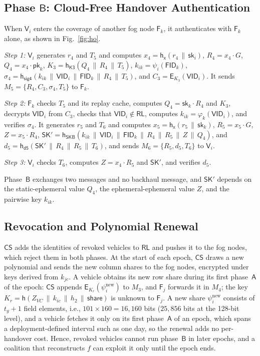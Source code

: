 \documentclass[journal]{IEEEtran}
\theoremstyle{plain}
\theoremstyle{definition}
\newcommand{\Veh}{\mathsf{V}}            %
\newcommand{\Fog}{\mathsf{F}}            %
\newcommand{\CS}{\mathsf{CS}}            %
\newcommand{\SK}{\mathsf{SK}}            %
\newcommand{\VID}{\mathsf{VID}}          %
\newcommand{\FID}{\mathsf{FID}}          %
\newcommand{\RL}{\mathsf{RL}}            %
\newcommand{\h}{\mathsf{h}}              %
\newcommand{\hT}[1]{\h_{\mathsf{#1}}}     %
\newcommand{\Enc}{\mathsf{E}}            %
\newcommand{\sk}{\mathsf{sk}}            %
\newcommand{\pk}{\mathsf{pk}}            %
\newcommand{\cat}{\,\|\,}               %
\begin{document}
\subsection{Phase \texorpdfstring{$\mathsf{B}$}{B}: Cloud-Free Handover Authentication}\label{sec:phaseB}
When $\Veh_i$ enters the coverage of another fog node $\Fog_k$, it authenticates with $\Fog_k$ alone, as shown in Fig.~\ref{fig:ho}.

\emph{Step 1:} $\Veh_i$ generates $r_4$ and $T_5$ and computes $x_4=\hT{x}(r_4\cat\sk_i)$, $R_4=x_4\cdot G$, $Q_4=x_4\cdot\pk_k$, $K_3=\hT{K3}(Q_4\cat R_4\cat T_5)$, $k_{ik}=\psi_i(\FID_k)$, $\sigma_4=\hT{sig4}(k_{ik}\cat\VID_i\cat\FID_k\cat R_4\cat T_5)$, and $C_3=\Enc_{K_3}(\VID_i)$. It sends $M_5=\{R_4,C_3,\sigma_4,T_5\}$ to $\Fog_k$.

\emph{Step 2:} $\Fog_k$ checks $T_5$ and its replay cache, computes $Q_4=\sk_k\cdot R_4$ and $K_3$, decrypts $\VID_i$ from $C_3$, checks that $\VID_i\notin\RL$, computes $k_{ik}=\varphi_k(\VID_i)$, and verifies $\sigma_4$. It generates $r_5$ and $T_6$ and computes $x_5=\hT{x}(r_5\cat\sk_k)$, $R_5=x_5\cdot G$, $Z=x_5\cdot R_4$, $\SK'=\hT{SKB}(k_{ik}\cat\VID_i\cat\FID_k\cat R_4\cat R_5\cat Z\cat Q_4)$, and $d_5=\hT{d5}(\SK'\cat R_4\cat R_5\cat T_6)$, and sends $M_6=\{R_5,d_5,T_6\}$ to $\Veh_i$.

\emph{Step 3:} $\Veh_i$ checks $T_6$, computes $Z=x_4\cdot R_5$ and $\SK'$, and verifies $d_5$.

Phase~$\mathsf{B}$ exchanges two messages and no backhaul message, and $\SK'$ depends on the static-ephemeral value $Q_4$, the ephemeral-ephemeral value $Z$, and the pairwise key $k_{ik}$.

\subsection{Revocation and Polynomial Renewal}\label{sec:revocation}
$\CS$ adds the identities of revoked vehicles to $\RL$ and pushes it to the fog nodes, which reject them in both phases. At the start of each epoch, $\CS$ draws a new polynomial and sends the new column shares to the fog nodes, encrypted under keys derived from $k_{jc}$. A vehicle obtains its new row share during its first phase~$\mathsf{A}$ of the epoch: $\CS$ appends $\Enc_{K_r}(\psi_i^{\mathrm{new}})$ to $M_3$, and $\Fog_j$ forwards it in $M_4$; the key $K_r=\h(Z_{VC}\cat k_{ic}\cat h_2\cat\mathsf{share})$ is unknown to $\Fog_j$. A new share $\psi_i^{\mathrm{new}}$ consists of $t_y+1$ field elements, i.e., $101\times160=16{,}160$ bits ($25{,}856$ bits at the 128-bit level), and a vehicle fetches it only on its first phase~$\mathsf{A}$ of an epoch, which spans a deployment-defined interval such as one day, so the renewal adds no per-handover cost. Hence, revoked vehicles cannot run phase~$\mathsf{B}$ in later epochs, and a coalition that reconstructs $f$ can exploit it only until the epoch ends.
\end{document}
